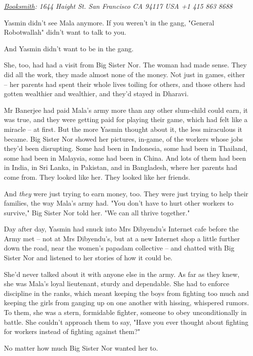 \emph{\href{http://thebooksmith.booksense.com}{Booksmith}: 1644 Haight St. San Francisco CA 94117 USA +1 415 863 8688}

Yasmin didn't see Mala anymore. If you weren't in the gang,
"General Robotwallah" didn't want to talk to you.

And Yasmin didn't want to be in the gang.

She, too, had had a visit from Big Sister Nor. The woman had made
sense. They did all the work, they made almost none of the money.
Not just in games, either -- her parents had spent their whole
lives toiling for others, and those others had gotten wealthier and
wealthier, and they'd stayed in Dharavi.

Mr Banerjee had paid Mala's army more than any other slum-child
could earn, it was true, and they were getting paid for playing
their game, which had felt like a miracle -- at first. But the more
Yasmin thought about it, the less miraculous it became. Big Sister
Nor showed her pictures, in-game, of the workers whose jobs they'd
been disrupting. Some had been in Indonesia, some had been in
Thailand, some had been in Malaysia, some had been in China. And
lots of them had been in India, in Sri Lanka, in Pakistan, and in
Bangladesh, where her parents had come from. They looked like her.
They looked like her friends.

And \emph{they} were just trying to earn money, too. They were just
trying to help their families, the way Mala's army had. "You don't
have to hurt other workers to survive," Big Sister Nor told her.
"We can all thrive together."

Day after day, Yasmin had snuck into Mrs Dibyendu's Internet cafe
before the Army met -- not at Mrs Dibyendu's, but at a new Internet
shop a little further down the road, near the women's papadam
collective -- and chatted with Big Sister Nor and listened to her
stories of how it could be.

She'd never talked about it with anyone else in the army. As far as
they knew, she was Mala's loyal lieutenant, sturdy and dependable.
She had to enforce discipline in the ranks, which meant keeping the
boys from fighting too much and keeping the girls from ganging up
on one another with hissing, whispered rumors. To them, she was a
stern, formidable fighter, someone to obey unconditionally in
battle. She couldn't approach them to say, "Have you ever thought
about fighting for workers instead of fighting against them?"

No matter how much Big Sister Nor wanted her to.

